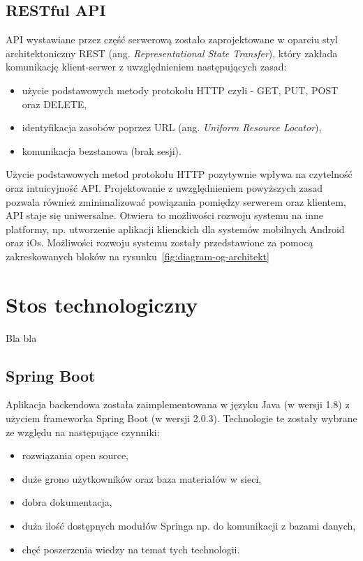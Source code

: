 \subsection{RESTful API}
API wystawiane przez część serwerową zostało zaprojektowane w oparciu styl architektoniczny REST (ang. \textit{Representational State Transfer}), który zakłada komunikację klient-serwer z uwzględnieniem następujących zasad: 
\begin{itemize}
\item użycie podstawowych metody protokołu HTTP czyli - GET, PUT, POST oraz DELETE,
\item identyfikacja zasobów poprzez URL (ang. \textit{Uniform Resource Locator}),
\item komunikacja bezstanowa (brak sesji).
\end{itemize}

Użycie podstawowych metod protokołu HTTP pozytywnie wpływa na czytelność oraz intuicyjność API. Projektowanie z uwzględnieniem powyższych zasad pozwala również zminimalizować powiązania pomiędzy serwerem oraz klientem, API staje się uniwersalne. Otwiera to możliwości rozwoju systemu na inne platformy, np. utworzenie aplikacji klienckich dla systemów mobilnych Android oraz iOs. Możliwości rozwoju systemu zostały przedstawione za pomocą zakreskowanych bloków na rysunku~\ref{fig:diagram-og-architekt}

\section{Stos technologiczny}

Bla bla

\subsection{Spring Boot}

Aplikacja backendowa została zaimplementowana w języku Java (w wersji 1.8) z użyciem frameworka Spring Boot (w wersji 2.0.3). Technologie te zostały wybrane ze względu na następujące czynniki:
 \begin{itemize}
\item rozwiązania open source,
\item duże grono użytkowników oraz baza materiałów w sieci,
\item dobra dokumentacja,
\item duża ilość dostępnych modułów Springa np. do komunikacji z bazami danych,
\item chęć poszerzenia wiedzy na temat tych technologii.
\end{itemize}

